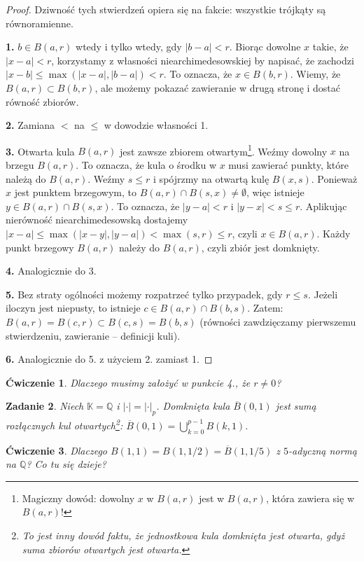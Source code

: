 \documentclass[a4paper,fleqn,9pt]{extarticle}
\newtheorem{prbh}{Zadanie}
\newtheorem{prb}[prbh]{\'Cwiczenie}
\begin{document}
\begin{proof}
Dziwność tych stwierdzeń opiera się na fakcie: wszystkie trójkąty są równoramienne.

\textbf{1.} $b\in B(a,r)$ wtedy i tylko wtedy, gdy $|b-a| < r$.
Biorąc dowolne $x$ takie, że $|x-a| < r$, korzystamy z własności niearchimedesowskiej by napisać, że zachodzi $|x-b| \le \max (|x-a|, |b-a|) < r$.
To oznacza, że $x\in B(b,r)$.
Wiemy, że $B(a,r) \subset B(b,r)$, ale możemy pokazać zawieranie w drugą stronę i dostać równość zbiorów.

\textbf{2.} Zamiana $<$ na $\le$ w dowodzie własności 1.

\textbf{3.} Otwarta kula $B(a,r)$ jest zawsze zbiorem otwartym\footnote{Magiczny dowód: dowolny $x$ w $B(a,r)$ jest w $B(a,r)$, która zawiera się w $B(a,r)$!}.
Weźmy dowolny $x$ na brzegu $B(a,r)$. To oznacza, że kula o środku w $x$ musi zawierać punkty, które należą do $B(a,r)$.
Weźmy $s\le r$ i spójrzmy na otwartą kulę $B(x,s)$. 
Ponieważ $x$ jest punktem brzegowym, to $B(a,r) \cap B(s,x) \neq \emptyset$, więc istnieje $y\in B(a,r) \cap B(s,x)$. 
To oznacza, że $|y-a| < r$ i $|y-x| < s \le r$.
Aplikując nierówność niearchimedesowską dostajemy $|x-a| \le \max(|x-y|, |y-a|) < \max(s,r) \le r$, czyli $x\in B(a,r)$.
Każdy punkt brzegowy $B(a,r)$ należy do $B(a,r)$, czyli zbiór jest domknięty.

\textbf{4.} Analogicznie do 3.

\textbf{5.} Bez straty ogólności możemy rozpatrzeć tylko przypadek, gdy $r\le s$.
Jeżeli iloczyn jest niepusty, to istnieje $c \in B(a,r) \cap B(b,s)$.
Zatem: $B(a,r) = B(c,r) \subset B(c,s) = B(b,s)$ (równości zawdzięczamy pierwszemu stwierdzeniu, zawieranie -- definicji kuli).

\textbf{6.} Analogicznie do 5. z użyciem 2. zamiast 1.
\end{proof}

\begin{prb}
Dlaczego musimy założyć w punkcie 4., że $r\neq 0$?
\end{prb}

\begin{prbh}
Niech $\mathbb K = \mathbb Q$ i $|\cdot| = |\cdot|_p$. 
Domknięta kula $\overline{B}(0,1)$ jest sumą rozłącznych kul otwartych\footnote{To jest inny dowód faktu, że jednostkowa kula domknięta jest otwarta, gdyż suma zbiorów otwartych jest otwarta.}: $\overline{B}(0,1) = \bigcup_{k=0}^{p-1} B(k,1)$.
\end{prbh}

\begin{prb}
Dlaczego $B(1,1) = B(1,1/2) = \overline{B}(1,1/5)$ z $5$-adyczną normą na $\mathbb Q$?
Co tu się dzieje?
\end{prb}
\end{document}
